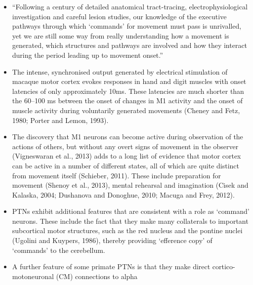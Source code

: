 {            \begin{itemize}
            \item
              ``Following a century of detailed anatomical
              tract-tracing, electrophysiological investigation and
              careful lesion studies, our knowledge of the executive
              pathways through which `commands' for movement must pass
              is unrivalled, yet we are still some way from really
              understanding how a movement is generated, which
              structures and pathways are involved and how they interact
              during the period leading up to movement onset.''
            \item
              The intense, synchronised output generated by electrical
              stimulation of macaque motor cortex evokes responses in
              hand and digit muscles with onset latencies of only
              approximately 10ms. These latencies are much shorter than
              the 60--100 ms between the onset of changes in M1 activity
              and the onset of muscle activity during voluntarily
              generated movements (Cheney and Fetz, 1980; Porter and
              Lemon, 1993).
            \item
              The discovery that M1 neurons can become active during
              observation of the actions of others, but without any
              overt signs of movement in the observer (Vigneswaran et
              al., 2013) adds to a long list of evidence that motor
              cortex can be active in a number of different states, all
              of which are quite distinct from movement itself
              (Schieber, 2011). These include preparation for movement
              (Shenoy et al., 2013), mental rehearsal and imagination
              (Cisek and Kalaska, 2004; Dushanova and Donoghue, 2010;
              Macuga and Frey, 2012).
            \item
              PTNs exhibit additional features that are consistent with
              a role as `command' neurons. These include the fact that
              they make many collaterals to important subcortical motor
              structures, such as the red nucleus and the pontine nuclei
              (Ugolini and Kuypers, 1986), thereby providing `efference
              copy' of `commands' to the cerebellum.
            \item
              A further feature of some primate PTNs is that they make
              direct cortico-motoneuronal (CM) connections to alpha

\end{itemize}}
